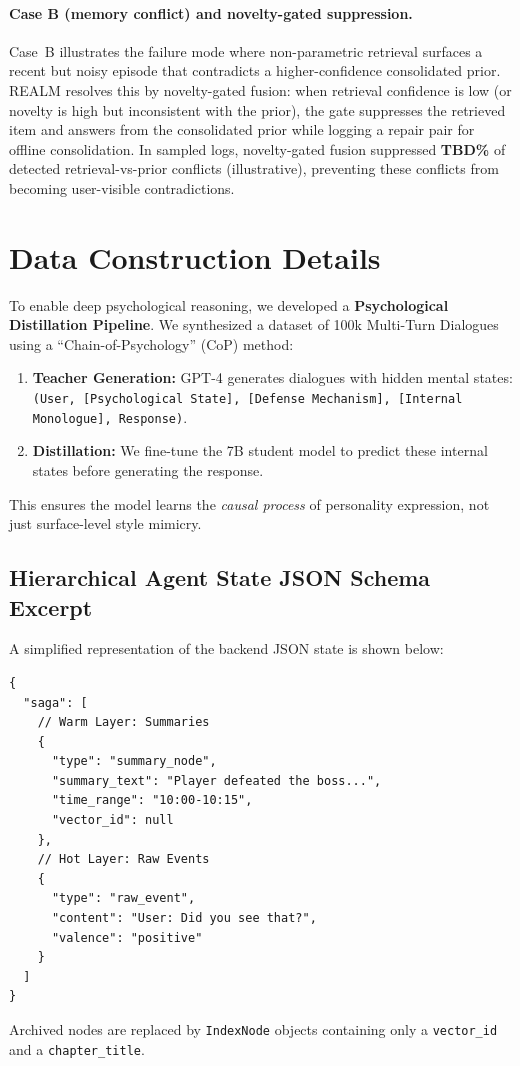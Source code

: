 \documentclass{article}
\begin{document}
\paragraph{Case B (memory conflict) and novelty-gated suppression.}
Case~B illustrates the failure mode where non-parametric retrieval surfaces a recent but noisy episode that contradicts a higher-confidence consolidated prior.
REALM resolves this by novelty-gated fusion: when retrieval confidence is low (or novelty is high but inconsistent with the prior), the gate suppresses the retrieved item and answers from the consolidated prior while logging a repair pair for offline consolidation.
In sampled logs, novelty-gated fusion suppressed \textbf{TBD\%} of detected retrieval-vs-prior conflicts (illustrative), preventing these conflicts from becoming user-visible contradictions.

\section{Data Construction Details}
\label{app:data-details}
To enable deep psychological reasoning, we developed a \textbf{Psychological Distillation Pipeline}. We synthesized a dataset of 100k Multi-Turn Dialogues using a ``Chain-of-Psychology'' (CoP) method:
\begin{enumerate}
    \item \textbf{Teacher Generation:} GPT-4 generates dialogues with hidden mental states: \texttt{(User, [Psychological State], [Defense Mechanism], [Internal Monologue], Response)}.
    \item \textbf{Distillation:} We fine-tune the 7B student model to predict these internal states before generating the response.
\end{enumerate}
This ensures the model learns the \textit{causal process} of personality expression, not just surface-level style mimicry.






\subsection{Hierarchical Agent State JSON Schema Excerpt}
\label{app:json-schema}
A simplified representation of the backend JSON state is shown below:
\begin{verbatim}
{
  "saga": [
    // Warm Layer: Summaries
    {
      "type": "summary_node",
      "summary_text": "Player defeated the boss...",
      "time_range": "10:00-10:15",
      "vector_id": null
    },
    // Hot Layer: Raw Events
    {
      "type": "raw_event",
      "content": "User: Did you see that?",
      "valence": "positive"
    }
  ]
}
\end{verbatim}
Archived nodes are replaced by \texttt{IndexNode} objects containing only a \texttt{vector\_id} and a \texttt{chapter\_title}.
\end{document}

